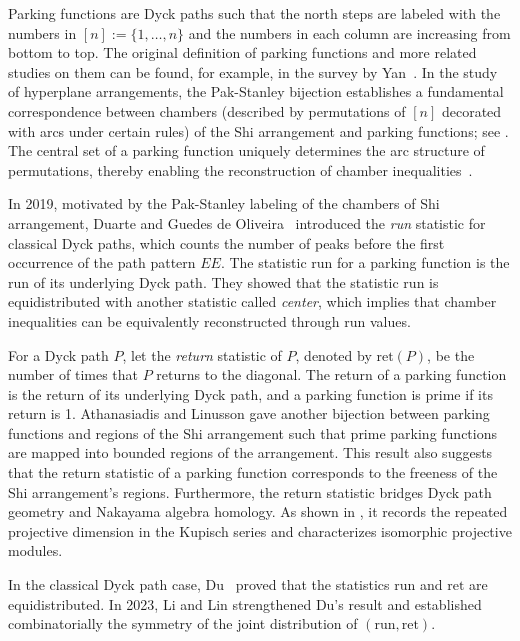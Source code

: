 \documentclass[11pt,a4paper,reqno]{article}
\newcommand{\run}{\mathrm{run}}
\newcommand{\ret}{\mathrm{ret}}
\begin{document}
    { 
    Parking functions are Dyck paths such that the north steps are labeled with the numbers in $[n]:=\{1,\ldots,n\}$ and the numbers in each column are increasing from bottom to top. The original definition of parking functions and more related studies on them can be found, for example, in the survey by Yan~\cite[Chapter 13]{Bona}. In the study of hyperplane arrangements, the Pak-Stanley bijection establishes a fundamental correspondence between chambers (described by permutations of $[n]$ decorated with arcs under certain rules) of the Shi arrangement and parking functions; see \cite{Sta96}. The central set of a parking function uniquely determines the arc structure of permutations, thereby enabling the reconstruction of chamber inequalities~\cite{Dua1}. 
    
    In 2019, motivated by the Pak-Stanley labeling of the chambers of Shi arrangement, Duarte and {Guedes de Oliveira~\cite{Dua2}} introduced the \textit{run} statistic for classical Dyck paths, which counts the number of peaks before the first occurrence of the path pattern $EE$. The statistic $\run$ for a parking function is the $\run$ of its underlying Dyck path. They showed that the statistic $\run$ is equidistributed with another statistic called \textit{center}, which implies that chamber inequalities can be equivalently reconstructed through run values. 
    
    For a Dyck path $P$, let the \textit{return} statistic of $P$, denoted by $\ret(P)$, be the number of times that $P$ returns to the diagonal. The return of a parking function is the return of its underlying Dyck path, and a parking function is prime if its return is 1.
    Athanasiadis and Linusson \cite{AL99} gave another bijection between parking functions and regions of the Shi arrangement such that prime parking functions are mapped into bounded regions of the arrangement. 
    This result also suggests that the return statistic of a parking function corresponds to the freeness of the Shi arrangement's regions.
 Furthermore, the return statistic bridges Dyck path geometry and Nakayama algebra homology. As shown in \cite{KlaszMarMar}, it records the repeated projective dimension in the Kupisch series and characterizes isomorphic projective modules.

   

    In the classical Dyck path case, Du~\cite{Du} proved that the statistics $\run$ and $\ret$ are equidistributed. In 2023, Li and Lin \cite{Li} strengthened Du's result and established combinatorially the symmetry of the joint distribution of $(\run, \ret)$. 

}
\end{document}
